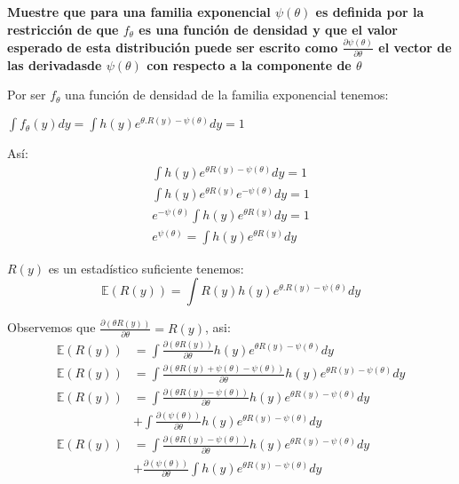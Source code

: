\documentclass[12pt,]{article}
\begin{document}
\textbf{Muestre que para una familia exponencial \(\psi(\theta)\) es
definida por la restricción de que \(f_\theta\) es una función de
densidad y que el valor esperado de esta distribución puede ser escrito
como \(\frac{\partial \psi(\theta)}{\partial \theta}\) el vector de las
derivadasde \(\psi (\theta)\) con respecto a la componente de
\(\theta\)}

Por ser \(f_\theta\) una función de densidad de la familia exponencial
tenemos:

\(\int f_\theta (y) dy = \int h(y)e^{\theta . R(y)-\psi(\theta)} dy =1\)

Así: \[
\begin{array}{rl}
\int h(y)e^{\theta R(y)-\psi(\theta)} dy =1\\
\int h(y)e^{\theta R(y)}e^{-\psi(\theta)} dy =1\\
e^{-\psi(\theta)} \int h(y)e^{\theta R(y)} dy =1\\
e^{\psi(\theta)} = \int h(y)e^{\theta R(y)} dy
\end{array}
\]

\(R(y)\) es un estadístico suficiente tenemos:
\[\mathbb{E}(R(y)) =\int R(y)h(y)e^{\theta . R(y)-\psi(\theta)} dy\]

Observemos que \(\frac{\partial (\theta R(y))}{\partial \theta}=R(y)\),
asi: \[
\begin{array}{rl}
\mathbb{E}(R(y)) & =\displaystyle \int \frac{\partial (\theta R(y))}{\partial \theta} h(y)e^{\theta  R(y)-\psi(\theta)} dy\\
\mathbb{E}(R(y)) & = \displaystyle \int \frac{\partial (\theta R(y)+\psi(\theta)-\psi(\theta))}{\partial \theta} h(y)e^{\theta  R(y)-\psi(\theta)} dy\\
\mathbb{E}(R(y)) & = \displaystyle \int \frac{\partial (\theta R(y)-\psi(\theta))}{\partial \theta} h(y)e^{\theta  R(y)-\psi(\theta)} dy\\
 & +\displaystyle \int \frac{\partial (\psi(\theta))}{\partial \theta} h(y)e^{\theta  R(y)-\psi(\theta)} dy\\
\mathbb{E}(R(y)) & = \displaystyle \int \frac{\partial (\theta R(y)-\psi(\theta))}{\partial \theta} h(y)e^{\theta  R(y)-\psi(\theta)} dy\\
& +\displaystyle \frac{\partial (\psi(\theta))}{\partial \theta} \int h(y)e^{\theta  R(y)-\psi(\theta)} dy\\
\end{array}
\]
\end{document}

